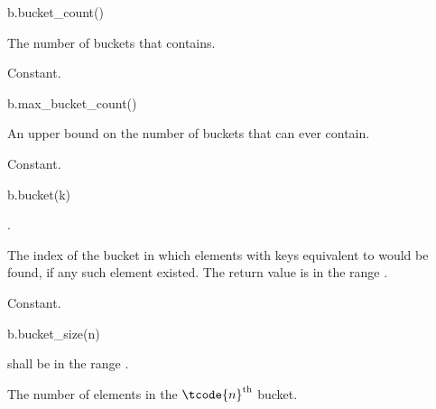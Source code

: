 %
\begin{itemdecl}
b.bucket_count()
\end{itemdecl}

\begin{itemdescr}
\pnum
\result
{}

\pnum
\returns
The number of buckets that  contains.

\pnum
\complexity
Constant.
\end{itemdescr}

%
\begin{itemdecl}
b.max_bucket_count()
\end{itemdecl}

\begin{itemdescr}
\pnum
\result
{}

\pnum
\returns
An upper bound on the number of buckets that  can ever contain.

\pnum
\complexity
Constant.
\end{itemdescr}

%
\begin{itemdecl}
b.bucket(k)
\end{itemdecl}

\begin{itemdescr}
\pnum
\result
{}

\pnum
\expects
{}.

\pnum
\returns
The index of the bucket
in which elements with keys equivalent to  would be found,
if any such element existed.
The return value is in the range \tcode{[0, b.bucket_count())}.

\pnum
\complexity
Constant.
\end{itemdescr}

%
\begin{itemdecl}
b.bucket_size(n)
\end{itemdecl}

\begin{itemdescr}
\pnum
\result
{}

\pnum
\expects
{} shall be in the range \tcode{[0, b.bucket_count())}.

\pnum
\returns
The number of elements in the $\tcode{n}^\text{th}$ bucket.

\pnum
\complexity
{}
\end{itemdescr}

